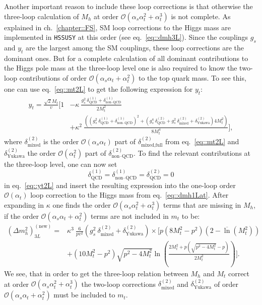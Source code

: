 \documentclass[a4paper,12pt]{book}
\begin{document}
Another important reason to include these loop corrections is that otherwise the three-loop calculation of $M_h$ at order $\mathcal{O}(\alpha_s\alpha_t^2+\alpha_t^3)$ is not complete. As explained in ch.\ \ref{chapter::FS}, SM loop corrections to the Higgs mass are implemented in \texttt{HSSUSY} at this order (see eq.\ \eqref{eq::dmh3L}). Since the couplings $g_s$ and $y_t$ are the largest among the SM couplings, these loop corrections are the dominant ones. But for a complete calculation of all dominant contributions to the Higgs pole mass at the three-loop level one is also required to know the two-loop contributions of order $\mathcal{O}(\alpha_s\alpha_t + \alpha_t^2)$ to the top quark mass. To see this, one can use eq.\ \eqref{eq::mt2L} to get the following expression for $y_t$:
\begin{align}
\nonumber
y_t = \frac{\sqrt{2}M_t}{v}\Biggl[1&-\kappa\> \frac{g_s^2 \>\delta^{(1)}_\text{QCD}+\delta^{(1)}_\text{non--QCD}}{2M_t^2}\\
\label{eq::yt2L}
&+ \kappa^2 \> \frac{\left(\left(g_s^2 \>\delta^{(1)}_\text{QCD}+\delta^{(1)}_\text{non--QCD}\right)^2 + \left(g_s^4 \>\delta^{(2)}_\text{QCD}+g_s^2 \>\delta^{(2)}_\text{mixed} +\delta^{(2)}_\text{Yukawa}\right)4M_t^2\right)}{8M_t^4}\Biggr],
\end{align}    
where $\delta^{(2)}_\text{mixed}$ is the order $\mathcal{O}(\alpha_s\alpha_t)$ part of $\delta^{(2)}_\text{mixed,full}$ from eq.\ \eqref{eq::mt2L} and $\delta^{(2)}_\text{Yukawa}$ the order $\mathcal{O}(\alpha_t^2)$ part of $\delta^{(2)}_\text{non--QCD}$. To find the relevant contributions at the three-loop level, one can now set 
\begin{equation}
\delta^{(1)}_\text{QCD}=\delta^{(1)}_\text{non--QCD}=\delta^{(2)}_\text{QCD}=0
\end{equation}
in eq.\ \eqref{eq::yt2L} and insert the resulting expression into the one-loop order $\mathcal{O}(\alpha_t)$ loop correction to the Higgs mass from eq.\ \eqref{eq::dmh1Lat}. After expanding in $\kappa$ one finds the order $\mathcal{O}(\alpha_s \alpha^2_t + \alpha_t^3)$ terms that are missing in $M_h$, if the order $\mathcal{O}(\alpha_s \alpha_t + \alpha_t^2)$ terms are not included in $m_t$ to be: 
\begin{align}
\nonumber
(\Delta m_h^2)^{(\text{new})}_{3L} = 
\nonumber
&\kappa^3 \> \frac{6}{p v^2}\left(g_s^2 \> \delta^{(2)}_\text{mixed} +\delta^{(2)}_\text{Yukawa}\right)\times\Biggl[p\left(8M_t^2-p^2\right)\left(2-\overline{\ln}\left(M_t^2\right)\right)\\
&+ \left(10M_t^2-p^2\right)\sqrt{p^2-4M_t^2}\ln\left(\frac{2M_t^2 + p \left(\sqrt{p^2-4M_t^2}-p\right)}{2M_t^2}\right)\Biggr].
\end{align}
We see, that in order to get the three-loop relation between $M_h$ and $M_t$ correct at order $\mathcal{O}(\alpha_s\alpha_t^2+\alpha_t^3)$ the two-loop corrections $\delta^{(2)}_\text{mixed}$ and $\delta^{(2)}_\text{Yukawa}$ of order $\mathcal{O}(\alpha_s\alpha_t+\alpha_t^2)$ must be included to $m_t$. 
\end{document}

